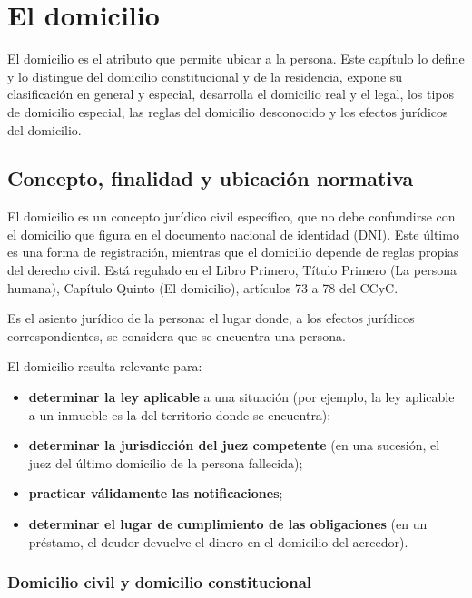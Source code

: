 \documentclass[12pt,oneside]{book}
\begin{document}
\chapter{El domicilio}
\label{cap:domicilio}

El domicilio es el atributo que permite ubicar a la persona. Este capítulo lo define y lo distingue del domicilio constitucional y de la residencia, expone su clasificación en general y especial, desarrolla el domicilio real y el legal, los tipos de domicilio especial, las reglas del domicilio desconocido y los efectos jurídicos del domicilio.

\section{Concepto, finalidad y ubicación normativa}

El domicilio es un concepto jurídico civil específico, que no debe confundirse con el domicilio que figura en el documento nacional de identidad (DNI). Este último es una forma de registración, mientras que el domicilio depende de reglas propias del derecho civil. Está regulado en el Libro Primero, Título Primero (La persona humana), Capítulo Quinto (El domicilio), artículos 73 a 78 del CCyC.

\begin{definicion}[Domicilio]
Es el asiento jurídico de la persona: el lugar donde, a los efectos jurídicos correspondientes, se considera que se encuentra una persona.
\end{definicion}

El domicilio resulta relevante para:

\begin{itemize}
\item \textbf{determinar la ley aplicable} a una situación (por ejemplo, la ley aplicable a un inmueble es la del territorio donde se encuentra);
\item \textbf{determinar la jurisdicción del juez competente} (en una sucesión, el juez del último domicilio de la persona fallecida);
\item \textbf{practicar válidamente las notificaciones};
\item \textbf{determinar el lugar de cumplimiento de las obligaciones} (en un préstamo, el deudor devuelve el dinero en el domicilio del acreedor).
\end{itemize}

\subsection{Domicilio civil y domicilio constitucional}
\end{document}

